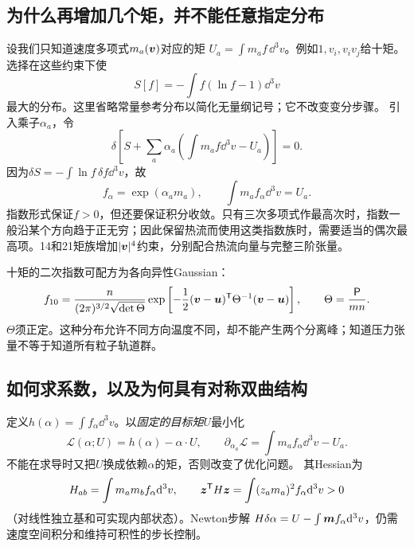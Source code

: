 \documentclass[UTF8,a4paper,11pt,openany,fontset=fandol]{ctexbook}
\begin{document}
\subsection{为什么再增加几个矩，并不能任意指定分布}
设我们只知道速度多项式$m_a(\bm{v})$对应的矩
$U_a=\int m_af\,\dd^3v$。例如$1,v_i,v_iv_j$给十矩。选择在这些约束下使
\begin{equation}
 S[f]=-\int f(\ln f-1)\dd^3v
\end{equation}
最大的分布。这里省略常量参考分布以简化无量纲记号；它不改变变分步骤。
引入乘子$\alpha_a$，令
\begin{equation}
 \delta\left[S+\sum_a\alpha_a\left(\int m_af\dd^3v-U_a\right)\right]=0.
\end{equation}
因为$\delta S=-\int\ln f\,\delta f\dd^3v$，故
\begin{equation}
 f_\alpha=\exp(\alpha_am_a),\qquad
 \int m_af_\alpha\dd^3v=U_a.
 \label{eq:selected-maxent}
\end{equation}
指数形式保证$f>0$，但还要保证积分收敛。只有三次多项式作最高次时，指数一般沿某个方向趋于正无穷；因此保留热流而使用这类指数族时，需要适当的偶次最高项。14和21矩族增加$|\bm{v}|^4$约束，分别配合热流向量与完整三阶张量。\citep{E553}

十矩的二次指数可配方为各向异性Gaussian：
\begin{equation}
 f_{10}={n\over(2\pi)^{3/2}\sqrt{\det\Theta}}
 \exp\left[-{1\over2}(\bm{v}-\bm{u})^{\mathsf T}\Theta^{-1}(\bm{v}-\bm{u})\right],
 \qquad\Theta={\mathsf P\over mn}.
\end{equation}
$\Theta$须正定。这种分布允许不同方向温度不同，却不能产生两个分离峰；知道压力张量不等于知道所有粒子轨道群。

\subsection{如何求系数，以及为何具有对称双曲结构}
定义$h(\alpha)=\int f_\alpha\dd^3v$。以\emph{固定的目标矩}$U$最小化
\begin{equation}
 \mathcal L(\alpha;U)=h(\alpha)-\alpha\cdot U,\qquad
 \partial_{\alpha_a}\mathcal L=\int m_af_\alpha\dd^3v-U_a.
\end{equation}
不能在求导时又把$U$换成依赖$\alpha$的矩，否则改变了优化问题。
其Hessian为
\begin{equation}
 H_{ab}=\int m_am_bf_\alpha\mathrm d^3v,\qquad
 \bm{z}^{\mathsf T}H\bm{z}=\int(z_am_a)^2f_\alpha\mathrm d^3v>0
\end{equation}
（对线性独立基和可实现内部状态）。Newton步解
$H\delta\alpha=U-\int\bm{m}f_\alpha\mathrm d^3v$，仍需速度空间积分和维持可积性的步长控制。
\end{document}
